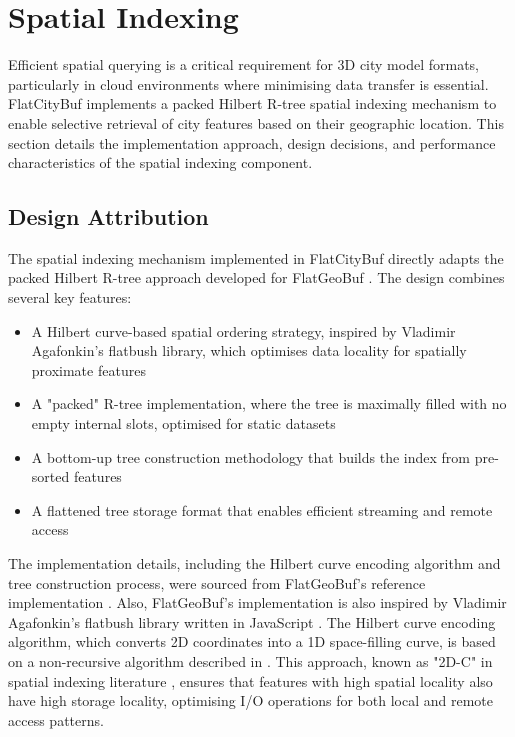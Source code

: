 
\section{Spatial Indexing}
\label{methodology:spatial_index}

Efficient spatial querying is a critical requirement for 3D city model formats, particularly in cloud environments where minimising data transfer is essential. FlatCityBuf implements a packed Hilbert R-tree spatial indexing mechanism \citep{Roussopoulos_Leifker_1985} to enable selective retrieval of city features based on their geographic location. This section details the implementation approach, design decisions, and performance characteristics of the spatial indexing component.

\subsection{Design Attribution}
\label{methodology:spatial_index:attribution}

The spatial indexing mechanism implemented in FlatCityBuf directly adapts the packed Hilbert R-tree approach developed for FlatGeoBuf \citep{horance_2022_detail}. The design combines several key features:

\begin{itemize}
  \item A Hilbert curve-based spatial ordering strategy, inspired by Vladimir Agafonkin's flatbush library, which optimises data locality for spatially proximate features
  \item A "packed" R-tree implementation, where the tree is maximally filled with no empty internal slots, optimised for static datasets
  \item A bottom-up tree construction methodology that builds the index from pre-sorted features
  \item A flattened tree storage format that enables efficient streaming and remote access
\end{itemize}

The implementation details, including the Hilbert curve encoding algorithm and tree construction process, were sourced from FlatGeoBuf's reference implementation \citep{flatgeobuf_github}. Also, FlatGeoBuf's implementation is also inspired by Vladimir Agafonkin's flatbush library written in JavaScript \citep{vladimir_2018}. The Hilbert curve encoding algorithm, which converts 2D coordinates into a 1D space-filling curve, is based on a non-recursive algorithm described in \citet{hacker_delight_2012}. This approach, known as "2D-C" in spatial indexing literature \citep{hacker_delight_2012}, ensures that features with high spatial locality also have high storage locality, optimising I/O operations for both local and remote access patterns.

